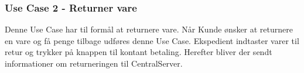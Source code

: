 \subsubsection{Use Case 2 - Returner vare}
Denne Use Case har til formål at returnere vare. Når Kunde ønsker at returnere en vare og få penge tilbage udføres denne Use Case. Ekspedient indtaster varer til retur og trykker på knappen til kontant betaling. Herefter bliver der sendt informationer om returneringen til CentralServer.
